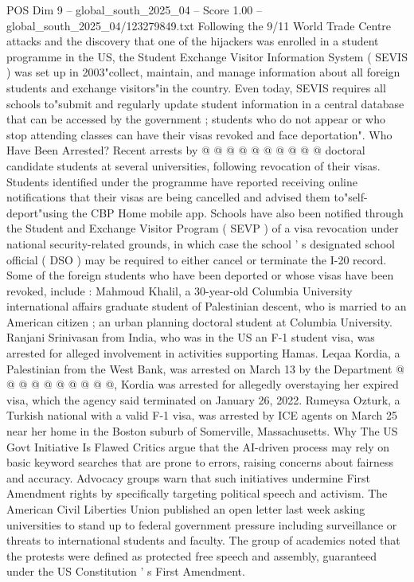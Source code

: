\begin{textsample}{POS Dim 9 – global\_south\_2025\_04 – Score 1.00 – global\_south\_2025\_04/123279849.txt}
Following the 9/11 World Trade Centre attacks and the discovery that one of the hijackers was enrolled in a student programme in the US, the Student Exchange Visitor Information System ( SEVIS ) was set up in 2003"collect, maintain, and manage information about all foreign students and exchange visitors"in the country.
Even today, SEVIS requires all schools to"submit and regularly update student information in a central database that can be accessed by the government ; students who do not appear or who stop attending classes can have their visas revoked and face deportation".
Who Have Been Arrested?
Recent arrests by @ @ @ @ @ @ @ @ @ @ doctoral candidate students at several universities, following revocation of their visas.
Students identified under the programme have reported receiving online notifications that their visas are being cancelled and advised them to"self-deport"using the CBP Home mobile app.
Schools have also been notified through the Student and Exchange Visitor Program ( SEVP ) of a visa revocation under national security-related grounds, in which case the school ' s designated school official ( DSO ) may be required to either cancel or terminate the I-20 record.
Some of the foreign students who have been deported or whose visas have been revoked, include : Mahmoud Khalil, a 30-year-old Columbia University international affairs graduate student of Palestinian descent, who is married to an American citizen ; an urban planning doctoral student at Columbia University.
Ranjani Srinivasan from India, who was in the US an F-1 student visa, was arrested for alleged involvement in activities supporting Hamas.
Leqaa Kordia, a Palestinian from the West Bank, was arrested on March 13 by the Department @ @ @ @ @ @ @ @ @ @, Kordia was arrested for allegedly overstaying her expired visa, which the agency said terminated on January 26, 2022.
Rumeysa Ozturk, a Turkish national with a valid F-1 visa, was arrested by ICE agents on March 25 near her home in the Boston suburb of Somerville, Massachusetts.
Why The US Govt Initiative Is Flawed Critics argue that the AI-driven process may rely on basic keyword searches that are prone to errors, raising concerns about fairness and accuracy.
Advocacy groups warn that such initiatives undermine First Amendment rights by specifically targeting political speech and activism.
The American Civil Liberties Union published an open letter last week asking universities to stand up to federal government pressure including surveillance or threats to international students and faculty.
The group of academics noted that the protests were defined as protected free speech and assembly, guaranteed under the US Constitution ' s First Amendment.

\end{textsample}

